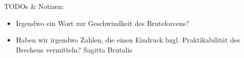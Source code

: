 TODOs \& Notizen:
\begin{itemize}
	\item Irgendwo ein Wort zur Geschwindkeit des Bruteforcens?
	\item Haben wir irgendwo Zahlen, die einen Eindruck bzgl. Praktikabilität des Brechens vermitteln? Sagitta Brutalis
\end{itemize}